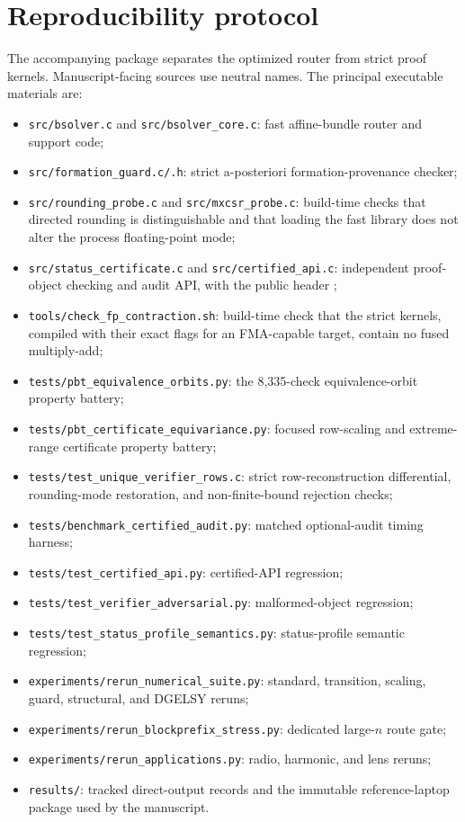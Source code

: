 \documentclass[11pt]{article}
\theoremstyle{definition}
\begin{document}
\section{Reproducibility protocol}\label{app:repro}
The accompanying package separates the optimized router from strict proof kernels. Manuscript-facing sources use neutral names. The principal executable materials are:
\begin{itemize}
\item \texttt{src/bsolver.c} and \texttt{src/bsolver\_core.c}: fast affine-bundle router and support code;
\item \texttt{src/formation\_guard.c/.h}: strict a-posteriori formation-provenance checker;
\item \texttt{src/rounding\_probe.c} and \texttt{src/mxcsr\_probe.c}: build-time checks that directed rounding is distinguishable and that loading the fast library does not alter the process floating-point mode;
\item \texttt{src/status\_certificate.c} and \texttt{src/certified\_api.c}: independent proof-object checking and audit API, with the public header ;
\item \texttt{tools/check\_fp\_contraction.sh}: build-time check that the strict kernels, compiled with their exact flags for an FMA-capable target, contain no fused multiply-add;
\item \texttt{tests/pbt\_equivalence\_orbits.py}: the 8,335-check equivalence-orbit property battery;
\item \texttt{tests/pbt\_certificate\_equivariance.py}: focused row-scaling and extreme-range certificate property battery;
\item \texttt{tests/test\_unique\_verifier\_rows.c}: strict row-reconstruction differential, rounding-mode restoration, and non-finite-bound rejection checks;
\item \texttt{tests/benchmark\_certified\_audit.py}: matched optional-audit timing harness;
\item \texttt{tests/test\_certified\_api.py}: certified-API regression;
\item \texttt{tests/test\_verifier\_adversarial.py}: malformed-object regression;
\item \texttt{tests/test\_status\_profile\_semantics.py}: status-profile semantic regression;
\item \texttt{experiments/rerun\_numerical\_suite.py}: standard, transition, scaling, guard, structural, and DGELSY reruns;
\item \texttt{experiments/rerun\_blockprefix\_stress.py}: dedicated large-$n$ route gate;
\item \texttt{experiments/rerun\_applications.py}: radio, harmonic, and lens reruns;
\item \texttt{results/}: tracked direct-output records and the immutable reference-laptop package used by the manuscript.
\end{itemize}
\end{document}

